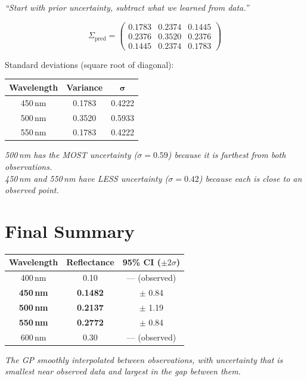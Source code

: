 \documentclass[11pt, a4paper]{article}
\newcommand{\note}[1]{{\small\color{notegreen}\textit{#1}}}
\newcommand{\expl}[1]{{\small\color{explgray}\textit{#1}}}
\begin{document}
\expl{``Start with prior uncertainty, subtract what we learned from data.''}

\[
\Sigma_{\text{pred}} =
\begin{pmatrix}
0.1783 & 0.2374 & 0.1445 \\
0.2376 & 0.3520 & 0.2376 \\
0.1445 & 0.2374 & 0.1783
\end{pmatrix}
\]

Standard deviations (square root of diagonal):

\begin{center}
\begin{tabular}{ccc}
\toprule
\textbf{Wavelength} & \textbf{Variance} & $\boldsymbol{\sigma}$ \\
\midrule
450\,nm & 0.1783 & 0.4222 \\
500\,nm & 0.3520 & 0.5933 \\
550\,nm & 0.1783 & 0.4222 \\
\bottomrule
\end{tabular}
\end{center}

\note{500\,nm has the MOST uncertainty ($\sigma = 0.59$) because it is farthest from both observations.\\
450\,nm and 550\,nm have LESS uncertainty ($\sigma = 0.42$) because each is close to an observed point.}


\section*{\color{secblue}Final Summary}

\begin{center}
\renewcommand{\arraystretch}{1.3}
\begin{tabular}{ccc}
\toprule
\textbf{Wavelength} & \textbf{Reflectance} & \textbf{95\% CI ($\pm 2\sigma$)} \\
\midrule
400\,nm & 0.10 & — (observed) \\
\textbf{450\,nm} & \textbf{0.1482} & $\pm$ 0.84 \\
\textbf{500\,nm} & \textbf{0.2137} & $\pm$ 1.19 \\
\textbf{550\,nm} & \textbf{0.2772} & $\pm$ 0.84 \\
600\,nm & 0.30 & — (observed) \\
\bottomrule
\end{tabular}
\end{center}

\bigskip
\note{The GP smoothly interpolated between observations, with uncertainty that is smallest near observed data and largest in the gap between them.}
\end{document}

